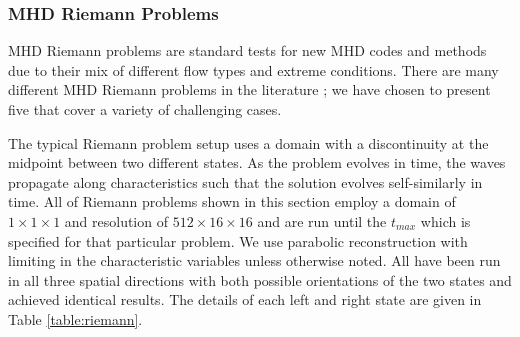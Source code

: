 \documentclass[modern, linenumbers]{aastex631}
\begin{document}
\subsubsection{MHD Riemann Problems}
\label{sec:riemann}

MHD Riemann problems are standard tests for new MHD codes and methods due to their mix of different flow types and extreme conditions. There are many different MHD Riemann problems in the literature \citep{brio_wu_1988, einfeldt_1991, ryu_jones_1995, dai_woodward_1998}; we have chosen to present five that cover a variety of challenging cases.

The typical Riemann problem setup uses a domain with a discontinuity at the midpoint between two different states. As the problem evolves in time, the waves propagate along characteristics such that the solution evolves self-similarly in time. All of Riemann problems shown in this section employ a domain of $1\times1\times1$ and resolution of $512\times16\times16$ and are run until the $t_{max}$ which is specified for that particular problem. We use parabolic reconstruction with limiting in the characteristic variables unless otherwise noted. All have been run in all three spatial directions with both possible orientations of the two states and achieved identical results. The details of each left and right state are given in Table \ref{table:riemann}.

\end{document}
